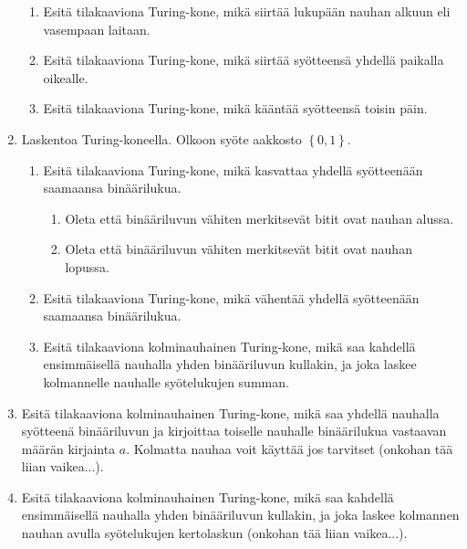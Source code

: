 \documentclass[finnish,11pt,draft]{article}
\newcommand{\set}[1]{{\left\{ #1 \right\}}}
\begin{document}
\begin{enumerate}
\begin{enumerate}
\item
Esitä tilakaaviona Turing-kone, mikä siirtää lukupään nauhan alkuun eli vasempaan laitaan.

\item
Esitä tilakaaviona Turing-kone, mikä siirtää syötteensä yhdellä paikalla oikealle.

\item
Esitä tilakaaviona Turing-kone, mikä kääntää syötteensä toisin päin.

\end{enumerate}

\item Laskentoa Turing-koneella. Olkoon syöte aakkosto $\set{0,1}$.
\begin{enumerate}
\item
Esitä tilakaaviona Turing-kone, mikä kasvattaa yhdellä syötteenään saamaansa binäärilukua. 
\begin{enumerate}
\item 
Oleta että binääriluvun vähiten merkitsevät bitit ovat nauhan alussa.
\item 
Oleta että binääriluvun vähiten merkitsevät bitit ovat nauhan lopussa.   

\end{enumerate}

\item
Esitä  
tilakaaviona Turing-kone, mikä vähentää yhdellä syötteenään saamaansa binäärilukua. 




\item
Esitä tilakaaviona kolminauhainen Turing-kone, mikä saa kahdellä ensimmäisellä nauhalla yhden binääriluvun kullakin, ja joka laskee kolmannelle nauhalle syötelukujen summan.




 
\end{enumerate}


\item 
Esitä tilakaaviona kolminauhainen  Turing-kone, mikä saa yhdellä nauhalla syötteenä binääriluvun ja kirjoittaa toiselle nauhalle binäärilukua vastaavan määrän kirjainta $a$. Kolmatta nauhaa voit käyttää jos tarvitset (onkohan tää liian vaikea...).

\item
Esitä tilakaaviona kolminauhainen  Turing-kone, 
mikä saa kahdellä ensimmäisellä nauhalla yhden binääriluvun kullakin, ja joka laskee kolmannen nauhan  avulla syötelukujen kertolaskun (onkohan tää liian vaikea...).



\end{enumerate}
\end{document}
